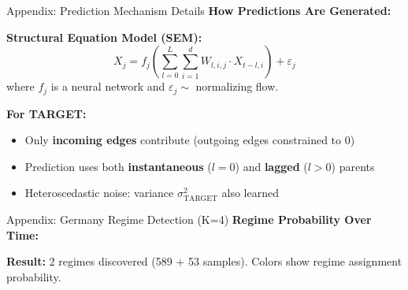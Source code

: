 \documentclass[aspectratio=169]{beamer}
\begin{document}
\begin{frame}{Appendix: Prediction Mechanism Details}
\textbf{How Predictions Are Generated:}

\vspace{0.1cm}
\begin{center}
\end{center}

\vspace{0.1cm}
\textbf{Structural Equation Model (SEM):}
\begin{equation*}
X_j = f_j\left(\sum_{l=0}^{L} \sum_{i=1}^{d} W_{l,i,j} \cdot X_{t-l,i}\right) + \varepsilon_j
\end{equation*}
where $f_j$ is a neural network and $\varepsilon_j \sim$ normalizing flow.

\vspace{0.1cm}
\textbf{For TARGET:}
\begin{itemize}
    \item Only \textbf{incoming edges} contribute (outgoing edges constrained to 0)
    \item Prediction uses both \textbf{instantaneous} ($l=0$) and \textbf{lagged} ($l>0$) parents
    \item Heteroscedastic noise: variance $\sigma^2_{\text{TARGET}}$ also learned
\end{itemize}
\end{frame}

\begin{frame}{Appendix: Germany Regime Detection (K=4)}
\textbf{Regime Probability Over Time:}
\begin{center}

\end{center}
\vspace{0.1cm}
\textbf{Result:} 2 regimes discovered (589 + 53 samples). Colors show regime assignment probability.
\end{frame}
\end{document}
